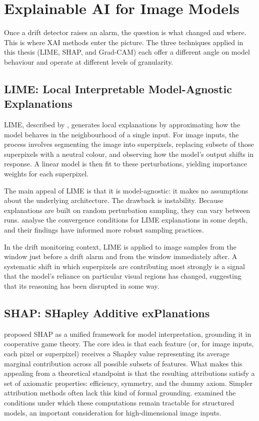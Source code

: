 \section{Explainable AI for Image Models}
\label{sec:xai}

Once a drift detector raises an alarm, the question is what changed and where. This is where XAI methods enter the picture. The three techniques applied in this thesis (LIME, SHAP, and Grad-CAM) each offer a different angle on model behaviour and operate at different levels of granularity.

\subsection{LIME: Local Interpretable Model-Agnostic Explanations}

LIME, described by \textcite{Ribeiro2016}, generates local explanations by approximating how the model behaves in the neighbourhood of a single input. For image inputs, the process involves segmenting the image into superpixels, replacing subsets of those superpixels with a neutral colour, and observing how the model's output shifts in response. A linear model is then fit to these perturbations, yielding importance weights for each superpixel.

The main appeal of LIME is that it is model-agnostic: it makes no assumptions about the underlying architecture. The drawback is instability. Because explanations are built on random perturbation sampling, they can vary between runs. \textcite{garreau2020explaining} analyse the convergence conditions for LIME explanations in some depth, and their findings have informed more robust sampling practices.

In the drift monitoring context, LIME is applied to image samples from the window just before a drift alarm and from the window immediately after. A systematic shift in which superpixels are contributing most strongly is a signal that the model's reliance on particular visual regions has changed, suggesting that its reasoning has been disrupted in some way.

\subsection{SHAP: SHapley Additive exPlanations}

\textcite{Lundberg2017} proposed SHAP as a unified framework for model interpretation, grounding it in cooperative game theory. The core idea is that each feature (or, for image inputs, each pixel or superpixel) receives a Shapley value representing its average marginal contribution across all possible subsets of features. What makes this appealing from a theoretical standpoint is that the resulting attributions satisfy a set of axiomatic properties: efficiency, symmetry, and the dummy axiom. Simpler attribution methods often lack this kind of formal grounding. \textcite{VandenBroeck2022} examined the conditions under which these computations remain tractable for structured models, an important consideration for high-dimensional image inputs.

